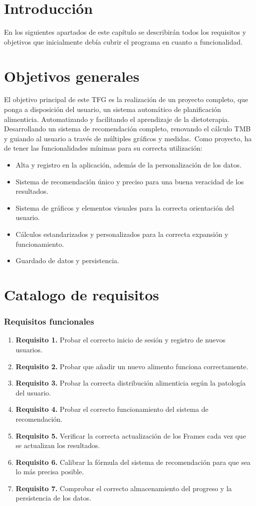 
\section{Introducción}
En los siguientes apartados de este capítulo se describirán todos los requisitos y objetivos que inicialmente debía cubrir el programa en cuanto a funcionalidad.
\section{Objetivos generales}
El objetivo principal de este TFG es la realización de un proyecto completo, que ponga a disposición del usuario, un sistema automático de planificación alimenticia. Automatizando y facilitando el aprendizaje de la dietoterapia. Desarrollando un sistema de recomendación completo, renovando el cálculo TMB y guiando al usuario a través de múltiples gráficos y medidas.\
Como proyecto, ha de tener las funcionalidades mínimas para su correcta utilización:
\begin{itemize}
\item Alta y registro en la aplicación, además de la personalización de los datos.
\item Sistema de recomendación único y preciso para una buena veracidad de los resultados.
\item Sistema de gráficos y elementos visuales para la correcta orientación del usuario.
\item Cálculos estandarizados y personalizados para la correcta expansión y funcionamiento.
\item Guardado de datos y persistencia.
\end{itemize}
\section{Catalogo de requisitos}
\subsubsection{Requisitos funcionales}
\begin{enumerate}
\item \textbf{Requisito 1.} Probar el correcto inicio de sesión y registro de nuevos usuarios.
\item \textbf{Requisito 2.} Probar que añadir un nuevo alimento funciona correctamente.
\item \textbf{Requisito 3.} Probar la correcta distribución alimenticia según la patología del usuario.
\item \textbf{Requisito 4.} Probar el correcto funcionamiento del sistema de recomendación.
\item \textbf{Requisito 5.} Verificar la correcta actualización de los Frames cada vez que se actualizan los resultados.
\item \textbf{Requisito 6.} Calibrar la fórmula del sistema de recomendación para que sea lo más precisa posible.
\item \textbf{Requisito 7.} Comprobar el correcto almacenamiento del progreso y la persistencia de los datos.
\end{enumerate}
